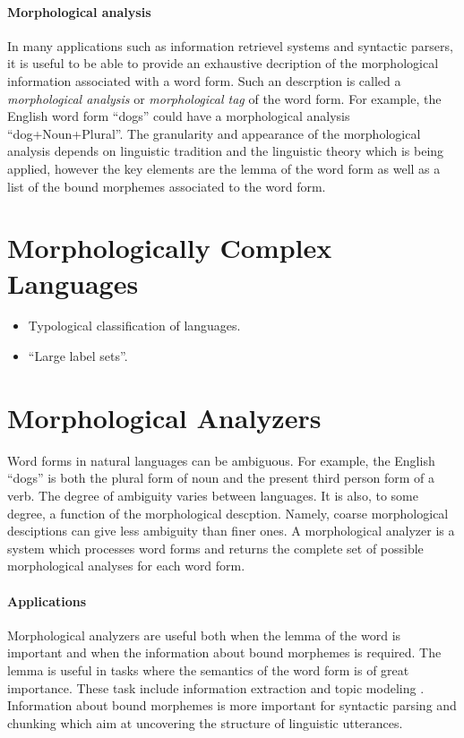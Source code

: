 \paragraph{Morphological analysis} In many applications such as
information retrievel systems and syntactic parsers, it is useful to
be able to provide an exhaustive decription of the morphological
information associated with a word form. Such an descrption is called
a {\it morphological analysis} or {\it morphological tag} of the word
form. For example, the English word form ``dogs'' could have a
morphological analysis ``dog+Noun+Plural''. The granularity and
appearance of the morphological analysis depends on linguistic
tradition and the linguistic theory which is being applied, however
the key elements are the lemma of the word form as well as a list of
the bound morphemes associated to the word form.

\section{Morphologically Complex Languages}
\begin{itemize}
\item Typological classification of languages.
\item ``Large label sets''.
\end{itemize}

\section{Morphological Analyzers}
Word forms in natural languages can be ambiguous. For example, the
English ``dogs'' is both the plural form of noun and the present third
person form of a verb. The degree of ambiguity varies between
languages. It is also, to some degree, a function of the morphological
descption. Namely, coarse morphological desciptions can give less
ambiguity than finer ones. A morphological analyzer is a system which
processes word forms and returns the complete set of possible
morphological analyses for each word form.

\paragraph{Applications} Morphological analyzers are useful both when
the lemma of the word is important and when the information about
bound morphemes is required. The lemma is useful in tasks where the
semantics of the word form is of great importance. These task include
information extraction \cite{someone} and topic modeling
\cite{someone}. Information about bound morphemes is more important
for syntactic parsing and chunking which aim at uncovering the
structure of linguistic utterances.

